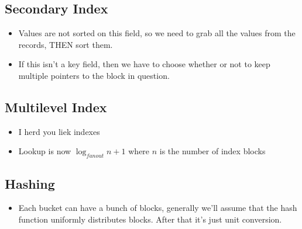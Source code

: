 \documentclass[11pt]{article}
\begin{document}
\subsection{Secondary Index}
\label{sec:org8facf41}
\begin{itemize}
\item Values are not sorted on this field, so we need to grab all the values from
the records, THEN sort them.
\item If this isn't a key field, then we have to choose whether or not to keep
multiple pointers to the block in question.
\end{itemize}

\subsection{Multilevel Index}
\label{sec:org0c8e3a7}
\begin{itemize}
\item I herd you liek indexes
\item Lookup is now \(\log_{fanout}{n} + 1\) where \(n\) is the number of index blocks
\end{itemize}

\subsection{Hashing}
\label{sec:orgeea01fe}
\begin{itemize}
\item Each bucket can have a bunch of blocks, generally we'll assume that the
hash function uniformly distributes blocks. After that it's just unit
conversion.
\end{itemize}
\end{document}
